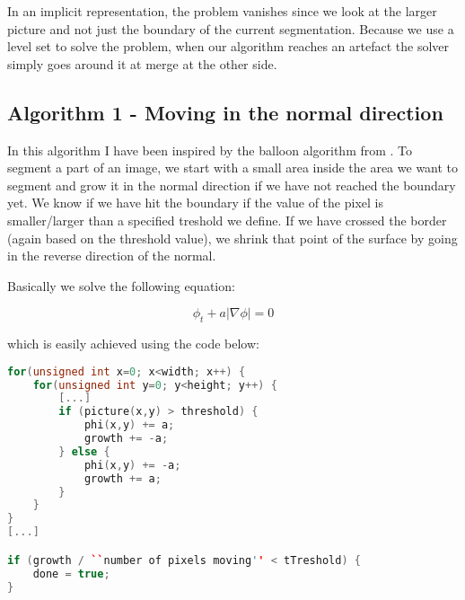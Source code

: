 In an implicit representation, the problem vanishes since we look at the larger picture and not just the boundary of the current segmentation. Because we use a level set to solve the problem, when our algorithm reaches an artefact the solver simply goes around it at merge at the other side.

\subsection{Algorithm 1 - Moving in the normal direction}
\label{segmentation:sec:algorithm1}


\begin{comment}
Start med noget mere overordnet og gå derefter i detaljer.

Læs igennem så det ikke står spredt men samlet.

Indsæt afsnit hvor jeg går direkte i dybden og overvej at fjerne ligning 1.1

\end{comment}

In this algorithm I have been inspired by the balloon algorithm from . 
To segment a part of an image, we start with a small area inside the area we want to segment and grow it in the normal direction if we have not reached the boundary yet. We know if we have hit the boundary if the value of the pixel is smaller/larger than a specified treshold we define. If we have crossed the border (again based on the threshold value), we shrink that point of the surface by going in the reverse direction of the normal.



Basically we solve the following equation:

\begin{equation}
  \phi_{t} + a|\nabla{\phi}| = 0
\end{equation}

which is easily achieved using the code below: 

\begin{listing}
\begin{lstlisting}[language=c++]
for(unsigned int x=0; x<width; x++) {
    for(unsigned int y=0; y<height; y++) {
        [...]
        if (picture(x,y) > threshold) {
            phi(x,y) += a;
            growth += -a;
        } else {
            phi(x,y) += -a;
            growth += a;
        }
    }
}
[...]

if (growth / ``number of pixels moving'' < tTreshold) {
    done = true;
}
\end{lstlisting}
\label{segmentation:code}
\end{listing}


